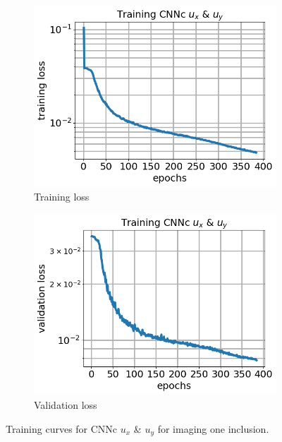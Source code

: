 \documentclass[12pt]{article}
\newcommand{\nhgfigheight}{4.0cm}
\begin{document}
%
\begin{figure}[h]
  \centering
  \begin{subfigure}[b]{0.45\linewidth}
    \includegraphics[totalheight=\nhgfigheight]{Figures/final1c/training/uxuy/field_images_plot_loss.png}
    \caption{Training loss}
  \end{subfigure}
  \begin{subfigure}[b]{0.45\linewidth}
    \includegraphics[totalheight=\nhgfigheight]{Figures/final1c/training/uxuy/field_images_plot_val_loss.png}
    \caption{Validation loss}
  \end{subfigure}
\caption{\label{fig:oneinctanh:trainuxuy} Training curves for CNNc $u_x$ \& $u_y$ for imaging one inclusion.}
\end{figure}
\end{document}
